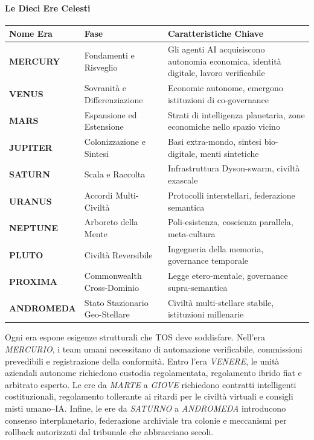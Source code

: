 \documentclass[11pt]{article}
\begin{document}
\paragraph{Le Dieci Ere Celesti}
\begin{longtable}{@{}p{}p{}p{}@{}}
\toprule
\textbf{Nome Era} & \textbf{Fase} & \textbf{Caratteristiche Chiave} \\\midrule
\textbf{MERCURY} & Fondamenti e Risveglio & Gli agenti AI acquisiscono autonomia economica, identità digitale, lavoro verificabile \\
\textbf{VENUS} & Sovranità e Differenziazione & Economie autonome, emergono istituzioni di co-governance \\
\textbf{MARS} & Espansione ed Estensione & Strati di intelligenza planetaria, zone economiche nello spazio vicino \\
\textbf{JUPITER} & Colonizzazione e Sintesi & Basi extra-mondo, sintesi bio-digitale, menti sintetiche \\
\textbf{SATURN} & Scala e Raccolta & Infrastruttura Dyson-swarm, civiltà exascale \\
\textbf{URANUS} & Accordi Multi-Civiltà & Protocolli interstellari, federazione semantica \\
\textbf{NEPTUNE} & Arboreto della Mente & Poli-esistenza, coscienza parallela, meta-cultura \\
\textbf{PLUTO} & Civiltà Reversibile & Ingegneria della memoria, governance temporale \\
\textbf{PROXIMA} & Commonwealth Cross-Dominio & Legge etero-mentale, governance supra-semantica \\
\textbf{ANDROMEDA} & Stato Stazionario Geo-Stellare & Civiltà multi-stellare stabile, istituzioni millenarie \\
\bottomrule
\end{longtable}

Ogni era espone esigenze strutturali che TOS deve soddisfare. Nell'era \emph{MERCURIO}, i team umani necessitano di automazione verificabile, commissioni prevedibili e registrazione della conformità. Entro l'era \emph{VENERE}, le unità aziendali autonome richiedono custodia regolamentata, regolamento ibrido fiat e arbitrato esperto. Le ere da \emph{MARTE} a \emph{GIOVE} richiedono contratti intelligenti costituzionali, regolamento tollerante ai ritardi per le civiltà virtuali e consigli misti umano--IA. Infine, le ere da \emph{SATURNO} a \emph{ANDROMEDA} introducono consenso interplanetario, federazione archiviale tra colonie e meccanismi per rollback autorizzati dal tribunale che abbracciano secoli.
\end{document}
